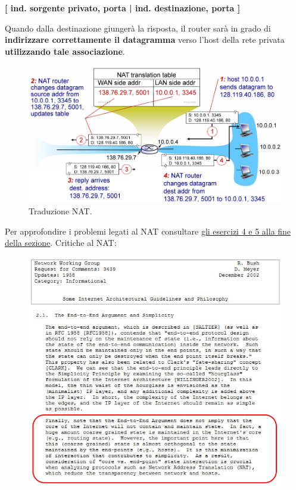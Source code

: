 \documentclass[11pt,a4paper,oneside]{book}
\theoremstyle{definition}
\begin{document}
\begin{center}
	\textbf{[ ind. sorgente privato, porta | ind. destinazione, porta ]}
\end{center}

Quando dalla destinazione giungerà la risposta, il router sarà in grado di \textbf{indirizzare correttamente il datagramma} verso l'host della rete privata \textbf{utilizzando tale associazione}.

\pagebreak

\begin{figure}[!h]
	\includegraphics[scale=0.37]{Immagini/Ip_nat_tr.png}
	\centering
	\caption{Traduzione NAT.}
\end{figure}

Per approfondire i problemi legati al NAT consultare \hyperref[sec:NATproblems]{gli esercizi 4 e 5 alla fine della sezione}. Critiche al NAT:

\begin{figure}[!h]
	\includegraphics[scale=0.55]{Immagini/Ip_nat_crit.png}
	\centering
\end{figure}
\end{document}
